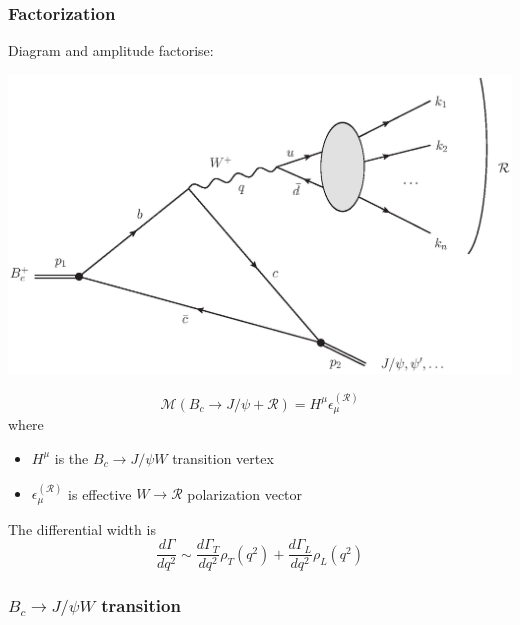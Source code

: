 \documentclass{beamer}
\newcommand{\R}{\mathcal{R}}
\newcommand{\M}{\mathcal{M}}
\begin{document}
\begin{frame}[t]
  \frametitle{Factorization}
  Diagram and amplitude factorise:
  \begin{center}
    \includegraphics[width=0.5\columnwidth]{diags_BcCCW}
  \end{center}
      $$\M\left(B_c \to J/\psi + \R\right) = H^\mu \epsilon^{(\R)}_\mu$$
   where
   \begin{itemize}
   \item $H^\mu$ is the $B_c\to J/\psi W$ transition vertex
   \item $\epsilon^{(\R)}_\mu$ is effective  $W\to\R$ polarization vector
   \end{itemize}
The differential width is
$$
\frac{d\Gamma}{dq^2} \sim \frac{d\Gamma_T}{dq^2} \rho_T\left(q^2\right) + \frac{d\Gamma_L}{dq^2} \rho_L\left(q^2\right)
$$
\end{frame}


\begin{frame}
  \frametitle{$B_c \to J/\psi W$ transition}
\end{frame}
\end{document}
